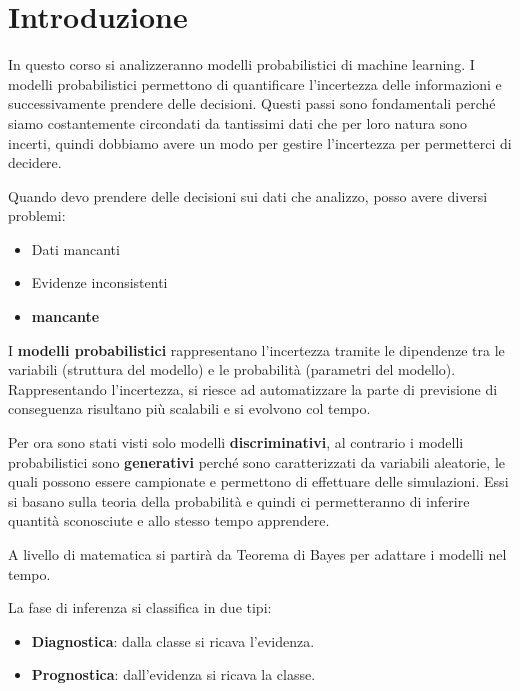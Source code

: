 \chapter{Introduzione}
In questo corso si analizzeranno modelli probabilistici di machine learning.
I modelli probabilistici permettono di quantificare l'incertezza delle informazioni
e successivamente prendere delle decisioni. Questi passi sono fondamentali perché
siamo costantemente circondati da tantissimi dati che per loro natura sono incerti,
quindi dobbiamo avere un modo per gestire l'incertezza per permetterci di decidere.

Quando devo prendere delle decisioni sui dati che analizzo, posso avere diversi
problemi:
\begin{itemize}
    \item Dati mancanti
    \item Evidenze inconsistenti
    \item \textbf{mancante}
\end{itemize}

I \textbf{modelli probabilistici} rappresentano l'incertezza tramite le dipendenze
tra le variabili (struttura del modello) e le probabilità (parametri del modello).
Rappresentando l'incertezza, si riesce ad automatizzare la parte di previsione
di conseguenza risultano più scalabili e si evolvono col tempo.

Per ora sono stati visti solo modelli \textbf{discriminativi}, al contrario i
modelli probabilistici sono \textbf{generativi} perché sono caratterizzati da
variabili aleatorie, le quali possono essere campionate e permettono di effettuare
delle simulazioni. Essi si basano sulla teoria della probabilità e quindi ci
permetteranno di inferire quantità sconosciute e allo stesso tempo apprendere.

A livello di matematica si partirà da Teorema di Bayes per adattare i modelli
nel tempo.

La fase di inferenza si classifica in due tipi:
\begin{itemize}
    \item \textbf{Diagnostica}: dalla classe si ricava l'evidenza.
    \item \textbf{Prognostica}: dall'evidenza si ricava la classe.
\end{itemize}

